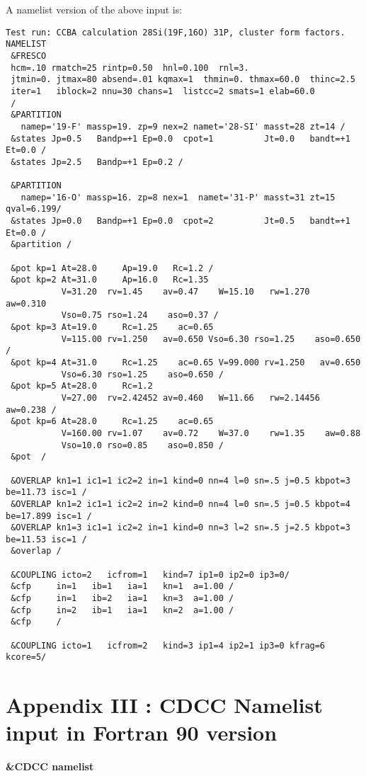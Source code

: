 \documentclass[11pt]{article}
\begin{document}
\newpage
A namelist version of the above input is:
\begin{verbatim}
Test run: CCBA calculation 28Si(19F,16O) 31P, cluster form factors.
NAMELIST
 &FRESCO
 hcm=.10 rmatch=25 rintp=0.50  hnl=0.100  rnl=3.
 jtmin=0. jtmax=80 absend=.01 kqmax=1  thmin=0. thmax=60.0  thinc=2.5
 iter=1   iblock=2 nnu=30 chans=1  listcc=2 smats=1 elab=60.0
 /
 &PARTITION
   namep='19-F' massp=19. zp=9 nex=2 namet='28-SI' masst=28 zt=14 /
 &states Jp=0.5   Bandp=+1 Ep=0.0  cpot=1          Jt=0.0   bandt=+1 Et=0.0 /
 &states Jp=2.5   Bandp=+1 Ep=0.2 /

 &PARTITION
   namep='16-O' massp=16. zp=8 nex=1  namet='31-P' masst=31 zt=15 qval=6.199/
 &states Jp=0.0   Bandp=+1 Ep=0.0  cpot=2          Jt=0.5   bandt=+1 Et=0.0 /
 &partition /

 &pot kp=1 At=28.0     Ap=19.0   Rc=1.2 /
 &pot kp=2 At=31.0     Ap=16.0   Rc=1.35
           V=31.20  rv=1.45    av=0.47    W=15.10   rw=1.270   aw=0.310
           Vso=0.75 rso=1.24    aso=0.37 /
 &pot kp=3 At=19.0     Rc=1.25    ac=0.65
           V=115.00 rv=1.250   av=0.650 Vso=6.30 rso=1.25    aso=0.650 /
 &pot kp=4 At=31.0     Rc=1.25    ac=0.65 V=99.000 rv=1.250   av=0.650
           Vso=6.30 rso=1.25    aso=0.650 /
 &pot kp=5 At=28.0     Rc=1.2
           V=27.00  rv=2.42452 av=0.460   W=11.66   rw=2.14456 aw=0.238 /
 &pot kp=6 At=28.0     Rc=1.25    ac=0.65
           V=160.00 rv=1.07    av=0.72    W=37.0    rw=1.35    aw=0.88
           Vso=10.0 rso=0.85    aso=0.850 /
 &pot  /

 &OVERLAP kn1=1 ic1=1 ic2=2 in=1 kind=0 nn=4 l=0 sn=.5 j=0.5 kbpot=3 be=11.73 isc=1 /
 &OVERLAP kn1=2 ic1=1 ic2=2 in=2 kind=0 nn=4 l=0 sn=.5 j=0.5 kbpot=4 be=17.899 isc=1 /
 &OVERLAP kn1=3 ic1=1 ic2=2 in=1 kind=0 nn=3 l=2 sn=.5 j=2.5 kbpot=3 be=11.53 isc=1 /
 &overlap /

 &COUPLING icto=2   icfrom=1   kind=7 ip1=0 ip2=0 ip3=0/
 &cfp     in=1   ib=1   ia=1   kn=1  a=1.00 /
 &cfp     in=1   ib=2   ia=1   kn=3  a=1.00 /
 &cfp     in=2   ib=1   ia=1   kn=2  a=1.00 /
 &cfp     /

 &COUPLING icto=1   icfrom=2   kind=3 ip1=4 ip2=1 ip3=0 kfrag=6 kcore=5/
\end{verbatim}

\newpage
\section*{Appendix III : CDCC Namelist input in Fortran 90 version}

{\bf \&CDCC namelist}
\end{document}
